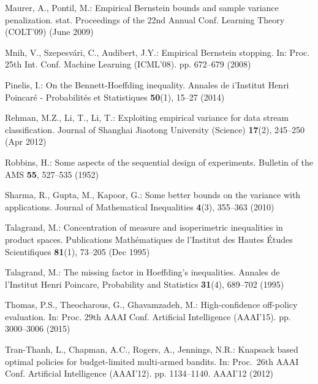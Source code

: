 \documentclass[runningheads, envcountsame, a4paper]{llncs}
\begin{document}
\begin{thebibliography}{10}
Maurer, A., Pontil, M.: Empirical {B}ernstein bounds and sample variance
  penalization. stat. Proceedings of the 22nd Annual Conf. Learning Theory
  (COLT'09) (June 2009)

Mnih, V., Szepesv\'{a}ri, C., Audibert, J.Y.: Empirical {B}ernstein stopping.
  In: Proc. 25th Int. Conf. Machine Learning (ICML'08). pp. 672--679 (2008)

Pinelis, I.: On the {B}ennett-{H}oeffding inequality. Annales de i'Institut
  Henri Poincar\'{e} - Probabilit\'{e}s et Statistiques  \textbf{50}(1),
  15--27 (2014)

Rehman, M.Z., Li, T., Li, T.: Exploiting empirical variance for data stream
  classification. Journal of Shanghai Jiaotong University (Science)
  \textbf{17}(2),  245--250 (Apr 2012)

Robbins, H.: Some aspects of the sequential design of experiments. Bulletin of
  the AMS  \textbf{55},  527--535 (1952)

Sharma, R., Gupta, M., Kapoor, G.: Some better bounds on the variance with
  applications. Journal of Mathematical Inequalities  \textbf{4}(3),  355--363
  (2010)

Talagrand, M.: Concentration of measure and isoperimetric inequalities in
  product spaces. Publications Math{\'e}matiques de l'Institut des Hautes
  {\'E}tudes Scientifiques  \textbf{81}(1),  73--205 (Dec 1995)

Talagrand, M.: The missing factor in {H}oeffding's inequalities. Annales de
  l'Institut Henri Poincare, Probability and Statistics  \textbf{31}(4),
  689--702 (1995)

Thomas, P.S., Theocharous, G., Ghavamzadeh, M.: High-confidence off-policy
  evaluation. In: Proc. 29th AAAI Conf. Artificial Intelligence (AAAI'15). pp.
  3000--3006 (2015)

Tran-Thanh, L., Chapman, A.C., Rogers, A., Jennings, N.R.: Knapsack based
  optimal policies for budget-limited multi-armed bandits. In: Proc.~26th AAAI
  Conf. Artificial Intelligence (AAAI'12). pp. 1134--1140. AAAI'12 (2012)

\end{thebibliography}
\end{document}
